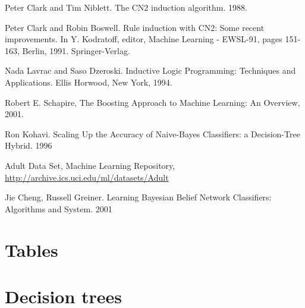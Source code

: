 \documentclass[a4paper]{llncs}
\begin{document}
\begin{thebibliography}{1}
Peter Clark and Tim Niblett. The CN2 induction algorithm. 1988.

Peter Clark and Robin Boswell. Rule induction with CN2: Some recent improvements. In Y. Kodratoff, editor, Machine Learning - EWSL-91, pages 151-163, Berlin, 1991. Springer-Verlag.

Nada Lavrac and Saso Dzeroski. Inductive Logic Programming: Techniques and Applications. Ellis Horwood, New York, 1994.

Robert E. Schapire, The Boosting Approach to Machine Learning: An Overview, 2001.

Ron Kohavi. Scaling Up the Accuracy of Naive-Bayes Classifiers: a Decision-Tree Hybrid. 1996

Adult Data Set, Machine Learning Repository, \url{http://archive.ics.uci.edu/ml/datasets/Adult}

Jie Cheng, Russell Greiner. Learning Bayesian Belief Network Classifiers: Algorithms and System. 2001

\end{thebibliography}

\clearpage

\appendix

\section{Tables}

\clearpage
\section{Decision trees}
\end{document}
